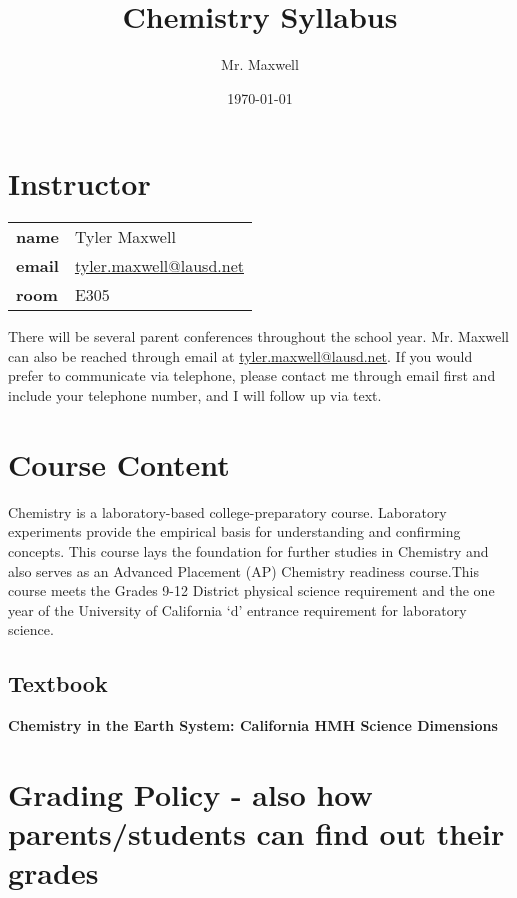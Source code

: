 \documentclass[11pt]{article}
\author{Mr. Maxwell}
\date{\today}
\title{Chemistry Syllabus}
\begin{document}
\maketitle

\section{Instructor}
\label{sec:org4d3ccf9}

\begin{center}
\begin{tabular}{ll}
\textbf{\textbf{name}} & Tyler Maxwell\\[0pt]
\textbf{\textbf{email}} & \href{mailto:tyler.maxwell@lausd.net}{tyler.maxwell@lausd.net}\\[0pt]
\textbf{\textbf{room}} & E305\\[0pt]
\end{tabular}
\end{center}

There will be several parent conferences throughout the school year. Mr. Maxwell can also be reached through email at \href{mailto:tyler.maxwell@lausd.net}{tyler.maxwell@lausd.net}. If you would prefer to communicate via telephone, please contact me through email first and include your telephone number, and I will follow up via text.

\section{Course Content}
\label{sec:org674cd80}

Chemistry is a laboratory-based college-preparatory course. Laboratory experiments provide the empirical basis for understanding and confirming concepts. This course lays the foundation for further studies in Chemistry and also serves as an Advanced Placement (AP) Chemistry readiness course.This course meets the Grades 9-12 District physical science requirement and the one year of the University of California ‘d’ entrance requirement for laboratory science.

\subsection{Textbook}
\label{sec:org02e15fa}

\textbf{\textbf{Chemistry in the Earth System: California HMH Science Dimensions}}

\section{Grading Policy - also how parents/students can find out their grades}
\label{sec:org64c7504}
\end{document}
